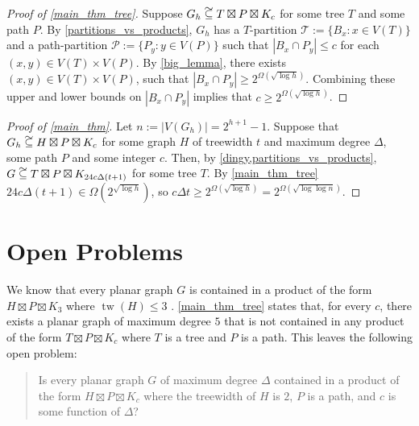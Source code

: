 \documentclass{patmorin}
\DeclareMathOperator{\tw}{tw}
\newcommand\subsetcong{\mathrel{\text{%
    \setbox0\hbox{$\subseteq$}%
    \rlap{\hbox to \wd0{\hss\hss\hss\raisebox{1.5\height}{$\sim$}\hss}}\box0
}}}
\renewcommand{\le}{\leqslant}
\renewcommand{\ge}{\geqslant}
\begin{document}
\begin{proof}[Proof of \cref{main_thm_tree}]
  Suppose $G_h\subsetcong T\boxtimes P\boxtimes K_c$ for some tree $T$ and some path $P$.  By \cref{partitions_vs_products}, $G_h$ has a $T$-partition $\mathcal{T}:=\{B_x:x\in V(T)\}$ and a path-partition $\mathcal{P}:=\{P_y:y\in V(P)\}$ such that $|B_x\cap P_y|\le c$ for each $(x,y)\in V(T)\times V(P)$.  By \cref{big_lemma}, there exists $(x,y)\in V(T)\times V(P)$, such that $|B_x\cap P_y| \ge 2^{\Omega(\sqrt{\log h})}$.  Combining these upper and lower bounds on $|B_x\cap P_y|$ implies that $c\ge 2^{\Omega(\sqrt{\log h})}$.
\end{proof}

\begin{proof}[Proof of \cref{main_thm}]
  Let $n:=|V(G_h)|=2^{h+1}-1$.  Suppose that $G_h\subsetcong H\boxtimes P\boxtimes K_c$ for some graph $H$ of treewidth $t$ and maximum degree $\Delta$, some path $P$ and some integer $c$.  Then, by \cref{dingy,partitions_vs_products}, $G\subsetcong T\boxtimes P\boxtimes K_{24 c \Delta (t+1)}$ for some tree $T$.  By \cref{main_thm_tree} $24 c \Delta (t+1) \in \Omega(2^{\sqrt{\log h}})$, so $c\Delta t \ge 2^{\Omega(\sqrt{\log h})} = 2^{\Omega(\sqrt{\log\log n})}$.
\end{proof}



\section{Open Problems}

We know that every planar graph $G$ is contained in a product of the form $H\boxtimes P\boxtimes K_3$ where $\tw(H)\le 3$ \cite{dujmovic.joret.ea:planar}. \cref{main_thm_tree} states that, for every $c$, there exists a planar graph of maximum degree $5$ that is not contained in any product of the form $T\boxtimes P\boxtimes K_c$ where $T$ is a tree and $P$ is a path.  This leaves the following open problem:

\begin{quote}

  Is every planar graph $G$ of maximum degree $\Delta$ contained in a product of the form $H\boxtimes P\boxtimes K_c$ where the treewidth of $H$ is $2$, $P$ is a path, and $c$ is some function of $\Delta$?
\end{quote}
\end{document}
